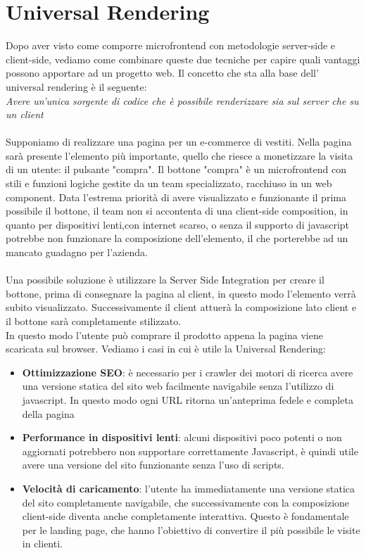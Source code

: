 \section{Universal Rendering}
Dopo aver visto come comporre microfrontend con metodologie server-side e client-side, vediamo come combinare queste due tecniche
per capire quali vantaggi possono apportare ad un progetto web.
Il concetto che sta alla base dell' universal rendering è il seguente:\\
\emph{Avere un'unica sorgente di codice che è possibile renderizzare sia sul server che su un client} \cite{ssr}
\\\\
Supponiamo di realizzare una pagina per un e-commerce di vestiti.
Nella pagina sarà presente l'elemento più importante, quello che riesce a monetizzare la visita di un utente: il pulsante "compra".
Il bottone "compra" è un microfrontend con stili e funzioni logiche gestite da un team specializzato, racchiuso in un web component.
Data l'estrema priorità di avere visualizzato e funzionante il prima possibile il bottone, il team non si accontenta di una client-side composition,
in quanto per dispositivi lenti,con internet scarso, o senza il supporto di javascript potrebbe non funzionare la composizione dell'elemento, 
il che porterebbe ad un mancato guadagno per l'azienda.
\\\\
Una possibile soluzione è utilizzare la Server Side Integration per creare il bottone, prima di consegnare la pagina al client, in questo modo l'elemento 
verrà subito visualizzato. Successivamente il client attuerà la composizione lato client e il bottone sarà completamente stilizzato.
\\In questo modo l'utente può comprare il prodotto appena la pagina viene scaricata sul browser.
\pagebreak
Vediamo i casi in cui è utile la Universal Rendering: \cite{angularUniversal}
\begin{itemize}
    \item \textbf{Ottimizzazione SEO}: è necessario per i crawler dei motori di ricerca avere una versione statica del sito web
    facilmente navigabile senza l'utilizzo di javascript. In questo modo ogni URL ritorna un'anteprima fedele e completa della pagina
    \item \textbf{Performance in dispositivi lenti}: alcuni dispositivi poco potenti o non aggiornati potrebbero non supportare correttamente
    Javascript, è quindi utile avere una versione del sito funzionante senza l'uso di scripts.
    \item \textbf{Velocità di caricamento}: l'utente ha immediatamente una versione statica del sito completamente navigabile, che successivamente
    con la composizione client-side diventa anche completamente interattiva. Questo è fondamentale per le landing page, che hanno l'obiettivo di convertire il più 
    possibile le visite in clienti.
\end{itemize}
